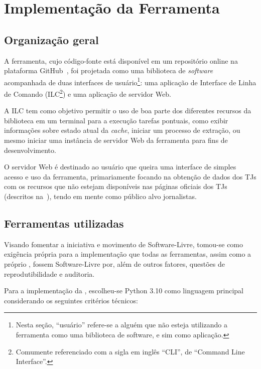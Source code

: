 \chapter{Implementação da Ferramenta \tjscraper~\label{chp:implementação-da-ferramenta}}

\section{Organização geral}

A ferramenta, cujo código-fonte está disponível em um repositório online na
plataforma GitHub~\cite{Taylor_Ienczak_Zanette_JPTIZ_tj-scraper_v0_1_1_-_2022},
foi projetada como uma biblioteca de \textit{software} acompanhada de duas
interfaces de usuário\footnote{Nesta seção, ``usuário'' refere-se a alguém que
não esteja utilizando a ferramenta como uma biblioteca de software, e sim como
aplicação.}: uma aplicação de Interface de Linha de Comando
(ILC\footnote{Comumente referenciado com a sigla em inglês ``CLI'', de
``Command Line Interface''.}) e uma aplicação de servidor Web.

A ILC tem como objetivo permitir o uso de boa parte dos diferentes recursos da
biblioteca em um terminal para a execução tarefas pontuais, como exibir
informações sobre estado atual da \textit{cache}, iniciar um processo de
extração, ou mesmo iniciar uma instância de servidor Web da ferramenta para
fins de desenvolvimento.

O servidor Web é destinado ao usuário que queira uma interface de simples
acesso e uso da ferramenta, primariamente focando na obtenção de dados dos TJs
com os recursos que não estejam disponíveis nas páginas oficiais dos TJs
(descritos na~), tendo em mente como público
alvo jornalistas.

\section{Ferramentas utilizadas~\label{section:ferramentas-utilizadas}}

Visando fomentar a iniciativa e movimento de Software-Livre, tomou-se como
exigência própria para a implementação que todas as ferramentas, assim como a
próprio \tjscraper, fossem Software-Livre por, além de outros fatores, questões
de reprodutibilidade e auditoria.

Para a implementação da \tjscraper, escolheu-se Python 3.10 como linguagem
principal considerando os seguintes critérios técnicos:

